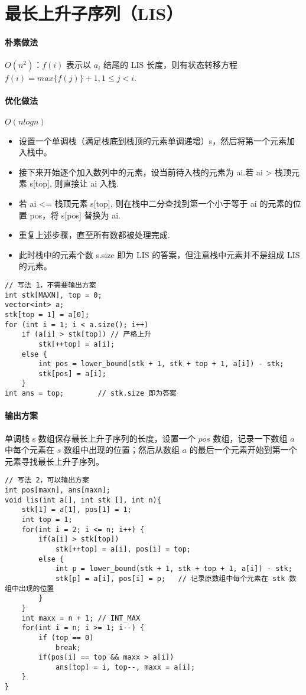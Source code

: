 \section{最长上升子序列（LIS）}
\paragraph{朴素做法} $O(n^2)$：$f(i)$ 表示以 $a_i$ 结尾的 LIS 长度，则有状态转移方程 $f(i) = max\{f(j)\} + 1, 1 \le j < i$.
\paragraph{优化做法}  $O(nlogn)$
\begin{itemize}
    \item 设置一个单调栈（满足栈底到栈顶的元素单调递增）s，然后将第一个元素加入栈中。
    \item 接下来开始逐个加入数列中的元素，设当前待入栈的元素为 ai.若 ai > 栈顶元素 s[top], 则直接让 ai 入栈.
    \item 若 ai <= 栈顶元素 s[top], 则在栈中二分查找到第一个小于等于 ai 的元素的位置 pos，将 s[pos] 替换为 ai.
    \item 重复上述步骤，直至所有数都被处理完成.
    \item 此时栈中的元素个数 s.size 即为 LIS 的答案，但注意栈中元素并不是组成 LIS 的元素。
\end{itemize}


\begin{verbatim}
// 写法 1，不需要输出方案
int stk[MAXN], top = 0;
vector<int> a;
stk[top = 1] = a[0];
for (int i = 1; i < a.size(); i++)
    if (a[i] > stk[top]) // 严格上升
        stk[++top] = a[i];
    else {
        int pos = lower_bound(stk + 1, stk + top + 1, a[i]) - stk;
        stk[pos] = a[i];
    }
int ans = top;        // stk.size 即为答案
\end{verbatim}
\paragraph{输出方案} 单调栈 s 数组保存最长上升子序列的长度，设置一个 $pos$ 数组，记录一下数组 $a$ 中每个元素在 $s$ 数组中出现的位置；然后从数组 $a$ 的最后一个元素开始到第一个元素寻找最长上升子序列。
\begin{verbatim}
// 写法 2，可以输出方案
int pos[maxn], ans[maxn];
void lis(int a[], int stk [], int n){
    stk[1] = a[1], pos[1] = 1;
    int top = 1;
    for(int i = 2; i <= n; i++) {
        if(a[i] > stk[top])
            stk[++top] = a[i], pos[i] = top;
        else {
            int p = lower_bound(stk + 1, stk + top + 1, a[i]) - stk;
            stk[p] = a[i], pos[i] = p;   // 记录原数组中每个元素在 stk 数组中出现的位置
        }
    }
    int maxx = n + 1; // INT_MAX
    for(int i = n; i >= 1; i--) {
        if (top == 0)
            break;
        if(pos[i] == top && maxx > a[i])
            ans[top] = i, top--, maxx = a[i];
    }
}
\end{verbatim}
